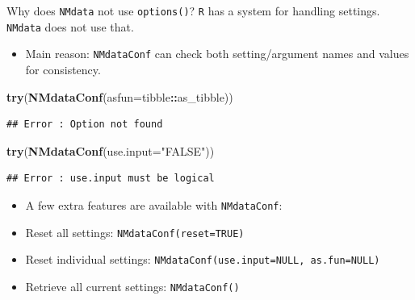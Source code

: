 \documentclass[
  8pt,
  ignorenonframetext,
  aspectratio=169]{beamer}
\newenvironment{Shaded}{\begin{snugshade}}{\end{snugshade}}
\newcommand{\DataTypeTok}[1]{\textcolor[rgb]{0.13,0.29,0.53}{#1}}
\newcommand{\KeywordTok}[1]{\textcolor[rgb]{0.13,0.29,0.53}{\textbf{#1}}}
\newcommand{\NormalTok}[1]{#1}
\newcommand{\OperatorTok}[1]{\textcolor[rgb]{0.81,0.36,0.00}{\textbf{#1}}}
\newcommand{\StringTok}[1]{\textcolor[rgb]{0.31,0.60,0.02}{#1}}
\providecommand{\tightlist}{%
  \setlength{\itemsep}{0pt}\setlength{\parskip}{0pt}}
\begin{document}
\begin{frame}[fragile]{Why does \texttt{NMdata} not use
\texttt{options()}?}
\protect\hypertarget{why-does-nmdata-not-use-options}{}
\texttt{R} has a system for handling settings. \texttt{NMdata} does not
use that.

\begin{itemize}
\tightlist
\item
  Main reason: \texttt{NMdataConf} can check both setting/argument names
  and values for consistency.
\end{itemize}

\begin{Shaded}
\begin{Highlighting}[]
\KeywordTok{try}\NormalTok{(}\KeywordTok{NMdataConf}\NormalTok{(}\DataTypeTok{asfun=}\NormalTok{tibble}\OperatorTok{::}\NormalTok{as\_tibble))}
\end{Highlighting}
\end{Shaded}

\begin{verbatim}
## Error : Option not found
\end{verbatim}

\begin{Shaded}
\begin{Highlighting}[]
\KeywordTok{try}\NormalTok{(}\KeywordTok{NMdataConf}\NormalTok{(}\DataTypeTok{use.input=}\StringTok{"FALSE"}\NormalTok{))}
\end{Highlighting}
\end{Shaded}

\begin{verbatim}
## Error : use.input must be logical
\end{verbatim}

\begin{itemize}
\tightlist
\item
  A few extra features are available with \texttt{NMdataConf}:
\item
  Reset all settings: \texttt{NMdataConf(reset=TRUE)}
\item
  Reset individual settings:
  \texttt{NMdataConf(use.input=NULL,\ as.fun=NULL)}
\item
  Retrieve all current settings: \texttt{NMdataConf()}
\end{itemize}
\end{frame}
\end{document}
